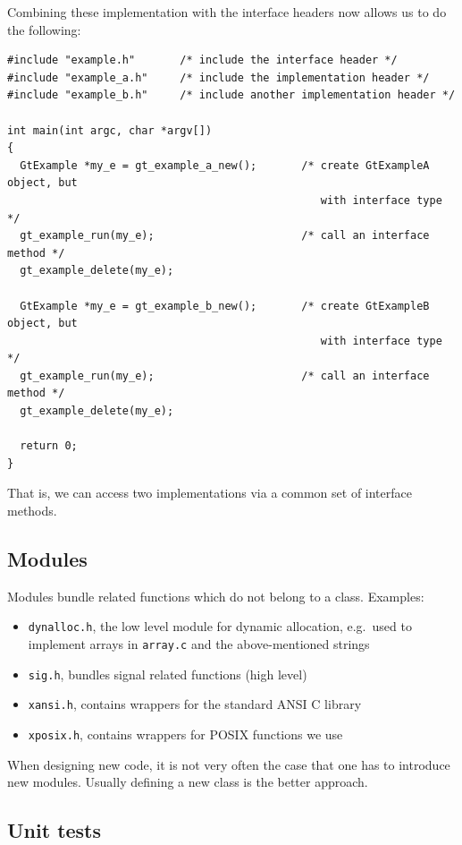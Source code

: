 \documentclass[11pt,final]{article}
\newcommand{\keyword}[1]{\lstinline{#1}}
\begin{document}
Combining these implementation with the interface headers now allows us to do
the following:

\begin{lstlisting}
#include "example.h"       /* include the interface header */
#include "example_a.h"     /* include the implementation header */
#include "example_b.h"     /* include another implementation header */

int main(int argc, char *argv[])
{
  GtExample *my_e = gt_example_a_new();       /* create GtExampleA object, but
                                                 with interface type */
  gt_example_run(my_e);                       /* call an interface method */
  gt_example_delete(my_e);

  GtExample *my_e = gt_example_b_new();       /* create GtExampleB object, but
                                                 with interface type */
  gt_example_run(my_e);                       /* call an interface method */
  gt_example_delete(my_e);
  
  return 0;
}
\end{lstlisting}

That is, we can access two implementations via a common set of interface
methods.

\subsection{Modules}

Modules bundle related functions which do not belong to a class. Examples:
\begin{itemize}
\item
\keyword{dynalloc.h}, the low level module for dynamic allocation,
e.g.\ used to implement arrays in \keyword{array.c} and the
above-mentioned strings
\item
\keyword{sig.h}, bundles signal related functions (high level)
\item
\keyword{xansi.h}, contains wrappers for the standard ANSI C library
\item
\keyword{xposix.h}, contains wrappers for POSIX functions we use
\end{itemize}

When designing new code, it is not very often the case that one has to introduce
new modules. Usually defining a new class is the better approach.

\subsection{Unit tests}
\end{document}
